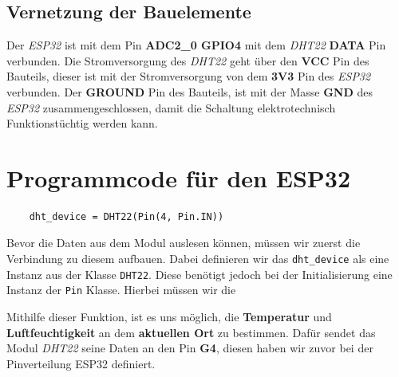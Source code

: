 \documentclass[9pt,a4paper]{report}
\begin{document}
	\subsection{Vernetzung der Bauelemente}
	Der \textit{ESP32} ist mit dem Pin \textbf{ADC2\_0 GPIO4} mit dem \textit{DHT22} \textbf{DATA} Pin verbunden.
	Die Stromversorgung des \textit{DHT22} geht über den \textbf{VCC} Pin des Bauteils, dieser ist mit der Stromversorgung von dem \textbf{3V3} Pin des \textit{ESP32} verbunden.
	Der \textbf{GROUND} Pin des Bauteils, ist mit der Masse \textbf{GND} des \textit{ESP32} zusammengeschlossen, damit die Schaltung elektrotechnisch Funktionstüchtig werden kann.
	
	\newpage
	\section[Programmcode]{Programmcode für den ESP32}
	\begin{lstlisting}
	dht_device = DHT22(Pin(4, Pin.IN))
	\end{lstlisting}
	Bevor die Daten aus dem Modul auslesen können, müssen wir zuerst die Verbindung zu diesem aufbauen. Dabei definieren wir das \texttt{dht\_device} als eine Instanz aus der Klasse \texttt{DHT22}. Diese benötigt jedoch bei der Initialisierung eine Instanz der \texttt{Pin} Klasse. Hierbei müssen wir die  
	
	Mithilfe dieser Funktion, ist es uns möglich, die \textbf{Temperatur} und \textbf{Luftfeuchtigkeit} an dem \textbf{aktuellen Ort} zu bestimmen. Dafür sendet das Modul \textit{DHT22} seine Daten an den Pin \textbf{G4}, diesen haben wir zuvor bei der Pinverteilung ESP32 definiert.
	
\end{document}
